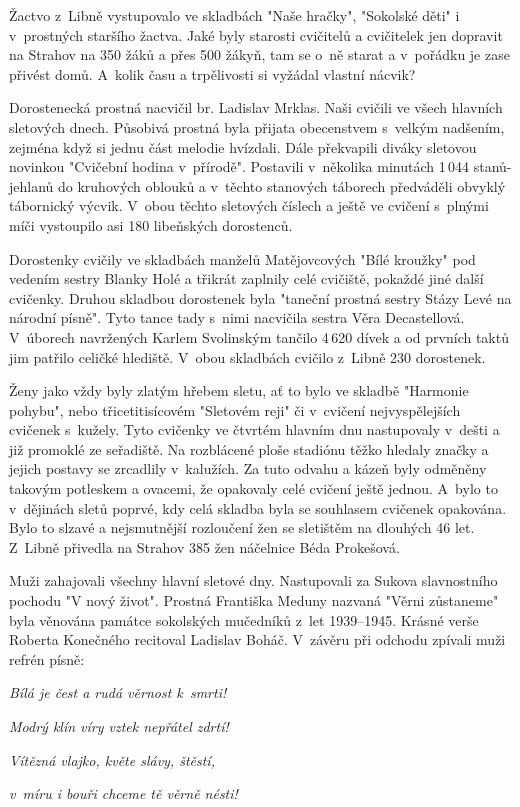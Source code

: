 \documentclass[a5paper, 11pt, twoside]{article}
\begin{document}
Žactvo z~Libně vystupovalo ve skladbách "Naše hračky", "Sokolské děti"
i v~prostných staršího žactva. Jaké byly starosti cvičitelů a cvičitelek
jen dopravit na Strahov na 350 žáků a přes 500 žákyň, tam se o~ně starat
a v~pořádku je zase přivést domů. A~kolik času a trpělivosti si vyžádal
vlastní nácvik?

Dorostenecká prostná nacvičil br. Ladislav Mrklas. Naši cvičili ve všech
hlavních sletových dnech. Působivá prostná byla přijata obecenstvem
s~velkým nadšením, zejména když si jednu část melodie hvízdali. Dále
překvapili diváky sletovou novinkou "Cvičební hodina v~přírodě".
Postavili v~několika minutách 1\,044 stanů-jehlanů do kruhových oblouků a
v~těchto stanových táborech předváděli obvyklý tábornický výcvik. V~obou
těchto sletových číslech a ještě ve cvičení s~plnými míči vystoupilo asi
180 libeňských dorostenců.

Dorostenky cvičily ve skladbách manželů Matějovcových "Bílé kroužky"
pod vedením sestry Blanky Holé a třikrát zaplnily celé cvičiště, pokaždé
jiné další cvičenky. Druhou skladbou dorostenek byla "taneční prostná
sestry Stázy Levé na národní písně". Tyto tance tady s~nimi nacvičila
sestra Věra Decastellová. V~úborech navržených Karlem Svolinským tančilo
4\,620 dívek a od prvních taktů jim patřilo celičké hlediště. V~obou
skladbách cvičilo z~Libně 230 dorostenek.

Ženy jako vždy byly zlatým hřebem sletu, ať to bylo ve
skladbě "Harmonie pohybu", nebo třicetitisícovém "Sletovém reji" či
v~cvičení nejvyspělejších cvičenek s~kužely. Tyto cvičenky ve čtvrtém
hlavním dnu nastupovaly v~dešti a již promoklé ze seřadiště. Na
rozblácené ploše stadiónu těžko hledaly značky a jejich postavy se
zrcadlily v~kalužích. Za tuto odvahu a kázeň byly odměněny takovým
potleskem a ovacemi, že opakovaly celé cvičení ještě jednou. A~bylo to
v~dějinách sletů poprvé, kdy celá skladba byla se souhlasem cvičenek
opakována. Bylo to slzavé a nejsmutnější rozloučení žen se sletištěm na
dlouhých 46 let. Z~Libně přivedla na Strahov 385 žen náčelnice Béda
Prokešová.

Muži zahajovali všechny hlavní sletové dny. Nastupovali za Sukova
slavnostního pochodu "V nový život". Prostná Františka Meduny nazvaná
"Věrni zůstaneme" byla věnována památce sokolských mučedníků z~let
1939--1945. Krásné verše Roberta Konečného recitoval Ladislav
Boháč. V~závěru při odchodu zpívali muži refrén písně:

\begin{center}
  
\textit{Bílá je čest a rudá věrnost k~smrti!}

\textit{Modrý klín víry vztek nepřátel zdrtí!}

\textit{Vítězná vlajko, květe slávy, štěstí,}

\textit{v~míru i bouři chceme tě věrně nésti!}
\end{center}
\end{document}

